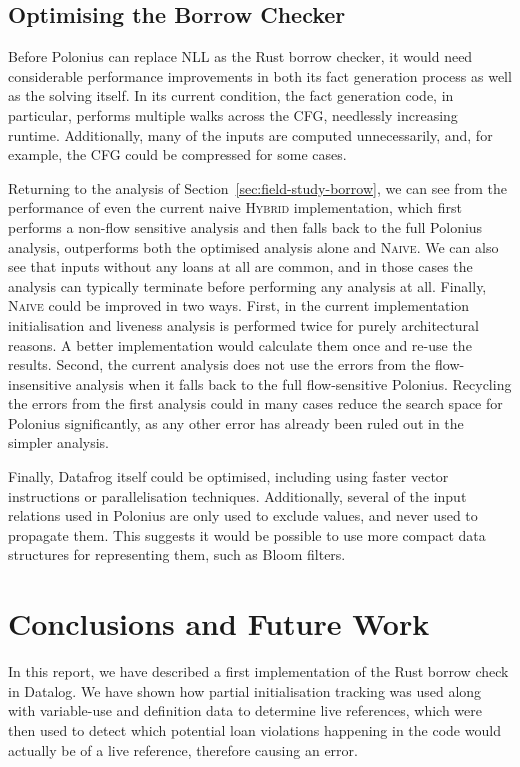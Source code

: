 \documentclass[11pt,a4paper,twoside,openany]{report}
\begin{document}
\section{Optimising the Borrow Checker}\label{sec:optim-borr-check}

Before Polonius can replace NLL as the Rust borrow checker, it would need
considerable performance improvements in both its fact generation process as
well as the solving itself. In its current condition, the fact generation code,
in particular, performs multiple walks across the CFG, needlessly increasing
runtime. Additionally, many of the inputs are computed unnecessarily, and, for
example, the CFG could be compressed for some cases.

Returning to the analysis of Section~\ref{sec:field-study-borrow}, we can see
from the performance of even the current naive \textsc{Hybrid} implementation,
which first performs a non-flow sensitive analysis and then falls back to the
full Polonius analysis, outperforms both the optimised analysis alone and
\textsc{Naive}. We can also see that inputs without any loans at all are common,
and in those cases the analysis can typically terminate before performing any
analysis at all. Finally, \textsc{Naive} could be improved in two ways. First,
in the current implementation initialisation and liveness analysis is performed
twice for purely architectural reasons. A better implementation would calculate
them once and re-use the results. Second, the current analysis does not use the
errors from the flow-insensitive analysis when it falls back to the full
flow-sensitive Polonius. Recycling the errors from the first analysis could in
many cases reduce the search space for Polonius significantly, as any other
error has already been ruled out in the simpler analysis.

Finally, Datafrog itself could be optimised, including using faster vector
instructions or parallelisation techniques. Additionally, several of the input
relations used in Polonius are only used to exclude values, and never used to
propagate them. This suggests it would be possible to use more compact data
structures for representing them, such as Bloom filters.

\chapter{Conclusions and Future Work}\label{cha:conclusions}

In this report, we have described a first implementation of the Rust borrow
check in Datalog. We have shown how partial initialisation tracking was used
along with variable-use and definition data to determine live references, which
were then used to detect which potential loan violations happening in the code
would actually be of a live reference, therefore causing an error.
\end{document}
